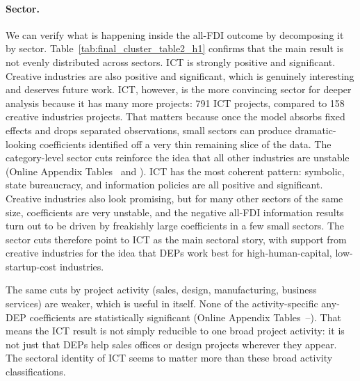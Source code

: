 \documentclass[12pt]{article}
\begin{document}
\paragraph{Sector.} We can verify what is happening inside the all-FDI outcome by decomposing it by sector. Table~\ref{tab:final_cluster_table2_h1} confirms that the main result is not evenly distributed across sectors. ICT is strongly positive and significant. Creative industries are also positive and significant, which is genuinely interesting and deserves future work. ICT, however, is the more convincing sector for deeper analysis because it has many more projects: 791 ICT projects, compared to 158 creative industries projects. That matters because once the model absorbs fixed effects and drops separated observations, small sectors can produce dramatic-looking coefficients identified off a very thin remaining slice of the data. The category-level sector cuts reinforce the idea that all other industries are unstable (Online Appendix Tables~ and ). ICT has the most coherent pattern: symbolic, state bureaucracy, and information policies are all positive and significant. Creative industries also look promising, but for many other sectors of the same size, coefficients are very unstable, and the negative all-FDI information results turn out to be driven by freakishly large coefficients in a few small sectors. The sector cuts therefore point to ICT as the main sectoral story, with support from creative industries for the idea that DEPs work best for high-human-capital, low-startup-cost industries.

The same cuts by project activity (sales, design, manufacturing, business services) are weaker, which is useful in itself. None of the activity-specific any-DEP coefficients are statistically significant (Online Appendix Tables~--). That means the ICT result is not simply reducible to one broad project activity: it is not just that DEPs help sales offices or design projects wherever they appear. The sectoral identity of ICT seems to matter more than these broad activity classifications.


\end{document}
